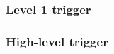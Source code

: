 \subsubsection{Level 1 trigger} \label{sec:L1Trigger}

\subsubsection{High-level trigger} \label{sec:HLT}